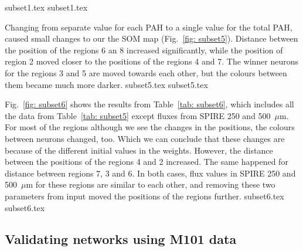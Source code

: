         {subset1.tex}
        {subset1.tex}

     

        Changing from separate value for each PAH to a single value for the total PAH, caused small changes to our the SOM map (Fig.~\ref{fig: subset5}). 
        Distance between the position of the regions 6 an 8 increased significantly, while the position of region 2 moved closer to the positions of the regions 4 and 7.
        The winner neurons for the regions 3 and 5 are moved towards each other, but the colours between them became much more darker. 
        {subset5.tex}
        {subset5.tex}

        Fig.~\ref{fig: subset6} shows the results from Table~\ref{tab: subset6}, which includes all the data from Table~\ref{tab: subset5} except fluxes from SPIRE 250 and 500~$\mu$m.
        For most of the regions although we see the changes in the positions, the colours between neurons changed, too. 
        Which we can conclude that these changes are because of the different initial values in the weights.
        However, the distance between the positions of the regions 4 and 2 increased.
        The same happened for distance between regions 7, 3 and 6.
        In both cases, flux values in SPIRE 250 and 500~$\mu$m for these regions are similar to each other, and removing these two parameters from input moved the positions of the regions further. 
        {subset6.tex}
        {subset6.tex}

       
       

        
    

        
        
        
        
   \subsection{ Validating networks using M101 data}
      